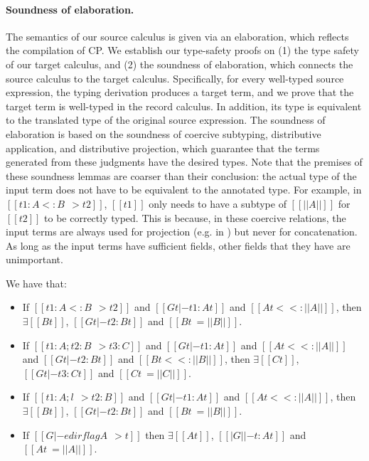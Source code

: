 \paragraph{Soundness of elaboration.}
The semantics of our source calculus is given via an elaboration, which reflects
the compilation of CP. We establish our type-safety proofs on (1) the type
safety of our target calculus, and (2) the soundness of elaboration, which
connects the source calculus to the target calculus. Specifically, for every
well-typed source expression, the typing derivation produces a target term, and
we prove that the target term is well-typed in the record calculus. In addition,
its type is equivalent to the translated type of the original source expression.
The soundness of elaboration is based on the soundness of coercive subtyping,
distributive application, and distributive projection, which guarantee that the
terms generated from these judgments have the desired types. Note that the
premises of these soundness lemmas are coarser than their conclusion: the actual
type of the input term does not have to be equivalent to the annotated type. For
example, in $[[t1 : A <: B ~~> t2]]$, $[[t1]]$ only needs to have a subtype of
$[[||A||]]$ for $[[t2]]$ to be correctly typed. This is because, in these
coercive relations, the input terms are always used for projection (e.g. in
) but never for concatenation. As long as the input terms
have sufficient fields, other fields that they have are unimportant.

\begin{theorem}\label{thm:ela-sound}
  We have that:
  \begin{itemize}
  \item If $[[t1 : A <: B ~~> t2]]$ and $[[  Gt |-  t1 : At ]]$ and $[[ At <<: ||A|| ]]$,
    then $\exists [[Bt]]$,
    $[[  Gt |-  t2 : Bt ]]$ and $[[ Bt ~= ||B|| ]]$.
  \item If $[[t1 : A ; t2 : B ~~> t3 : C]]$ and $[[  Gt |-  t1 : At ]]$ and $[[ At <<: ||A|| ]]$ and
    $[[  Gt |-  t2 : Bt ]]$ and $[[ Bt <<: ||B|| ]]$,
    then  $\exists [[Ct]]$,
    $[[  Gt |-  t3 : Ct ]]$ and $[[ Ct ~= ||C|| ]]$.
  \item If $[[t1 : A ; { l } ~~> t2 : B]]$ and $[[  Gt |-  t1 : At ]]$ and $[[ At <<: ||A|| ]]$,
    then  $\exists [[Bt]]$,
    $[[  Gt |-  t2 : Bt ]]$ and $[[ Bt ~= ||B|| ]]$.
  \item If $[[G |- e dirflag A ~~> t]]$ then $\exists [[At]]$,
    $[[ | G | |-  t : At ]]$ and $[[ At ~= ||A|| ]]$.
  \end{itemize}
\end{theorem}

